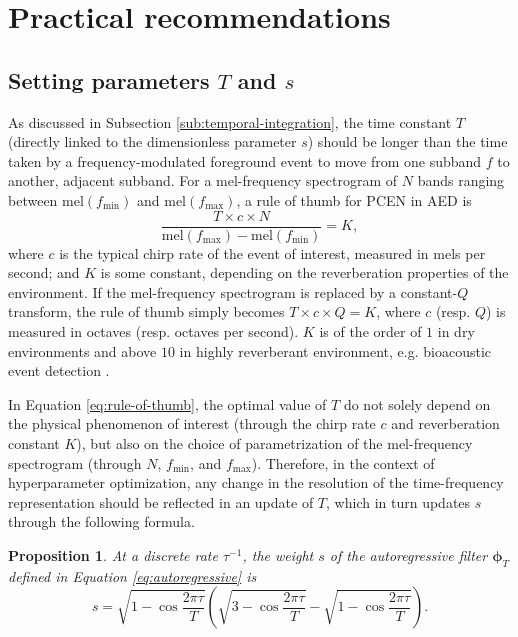\documentclass[journal]{IEEEtran}
\makeatletter
\newcommand*{\eg}{e.g.\@\xspace}
\newcommand*{\resp}{resp.\@\xspace}
\newtheorem{prop}[thm]{Proposition}
\theoremstyle{remark}
\makeatother
\begin{document}
\section{Practical recommendations\label{sec:practical-recommendations}}


\subsection{Setting parameters $T$ and $s$}

As discussed in Subsection \ref{sub:temporal-integration}, the time constant $T$ (directly linked to the dimensionless parameter $s$) should be longer than the time taken by a frequency-modulated foreground event to move from one subband $f$ to another, adjacent subband.
For a mel-frequency spectrogram of $N$ bands ranging between $\mathrm{mel}(f_{\min})$ and $\mathrm{mel}(f_{\max})$, a rule of thumb for PCEN in AED is
\begin{equation}
\dfrac{T\times c \times N}{\mathrm{mel}(f_{\max}) - \mathrm{mel}(f_{\min})} = K,
\label{eq:rule-of-thumb}
\end{equation}
where $c$ is the typical chirp rate of the event of interest, measured in mels per second; and $K$ is some constant, depending on the reverberation properties of the environment.
If the mel-frequency spectrogram is replaced by a constant-$Q$ transform, the rule of thumb simply becomes $T \times c \times Q = K$,
where $c$ (\resp{} $Q$) is measured in octaves (\resp{} octaves per second).
$K$ is of the order of $1$ in  dry environments 
and above $10$ in highly reverberant environment, \eg{} bioacoustic event detection \cite{salamon2016plos,shonfield2017ace}.

In Equation \ref{eq:rule-of-thumb}, the optimal value of $T$ do not solely depend on the physical phenomenon of interest (through the chirp rate $c$ and reverberation constant $K$), but also on the choice of parametrization of the mel-frequency spectrogram (through $N$, $f_\mathrm{\min}$, and $f_\mathrm{\max}$).
Therefore,
in the context of hyperparameter optimization,
any change in the resolution of the time-frequency representation
should be reflected in an update of $T$, which in turn updates $s$ through the following formula.
\begin{prop}
\label{prop:T-to-s}
At a discrete rate $\tau^{-1}$, the weight $s$ of the autoregressive filter $\boldsymbol{\phi}_T$ defined in Equation \ref{eq:autoregressive} is
\begin{equation}
s = \sqrt{1 - \cos \dfrac{2\pi \tau}{T}} \left(\sqrt{3 - \cos \dfrac{2\pi \tau}{T}} - \sqrt{1 - \cos \dfrac{2\pi \tau}{T}}  \right).
\end{equation}
\end{prop}
\end{document}
